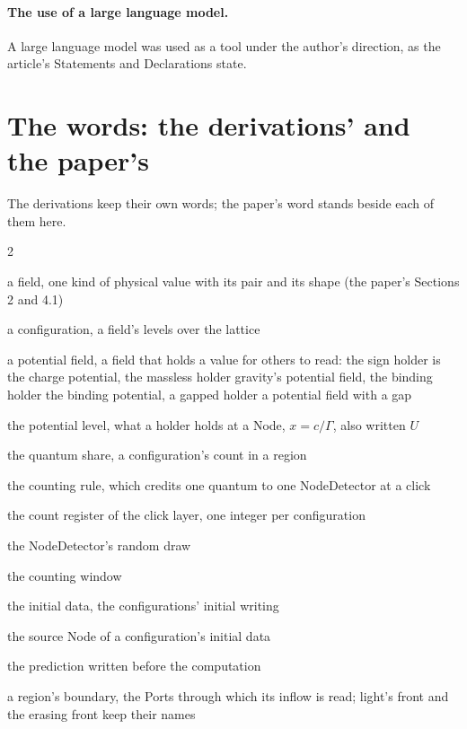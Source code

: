\documentclass[pdflatex,sn-mathphys-num]{sn-jnl}
\theoremstyle{thmstyleone}
\begin{document}
\paragraph{The use of a large language model.} A large language model was used as a tool under the author's direction, as the article's Statements and Declarations state.

\section*{The words: the derivations' and the paper's}

\noindent The derivations keep their own words; the paper's word stands beside each of them here.
\begin{multicols}{2}\small\begin{description}[style=unboxed,leftmargin=0pt,itemsep=0pt,parsep=0pt,font=\normalfont\itshape]
\item[family] a field, one kind of physical value with its pair and its shape (the paper's Sections 2 and 4.1)
\item[record] a configuration, a field's levels over the lattice
\item[holder] a potential field, a field that holds a value for others to read: the sign holder is the charge potential, the massless holder gravity's potential field, the binding holder the binding potential, a gapped holder a potential field with a gap
\item[content] the potential level, what a holder holds at a Node, $x = c / \Gamma$, also written $U$
\item[share] the quantum share, a configuration's count in a region
\item[credit, the credit rule] the counting rule, which credits one quantum to one NodeDetector at a click
\item[books] the count register of the click layer, one integer per configuration
\item[draw] the NodeDetector's random draw
\item[window] the counting window
\item[lay, laid] the initial data, the configurations' initial writing
\item[root] the source Node of a configuration's initial data
\item[blind, the blind row] the prediction written before the computation
\item[front] a region's boundary, the Ports through which its inflow is read; light's front and the erasing front keep their names

\end{description}
\end{multicols}
\end{document}
